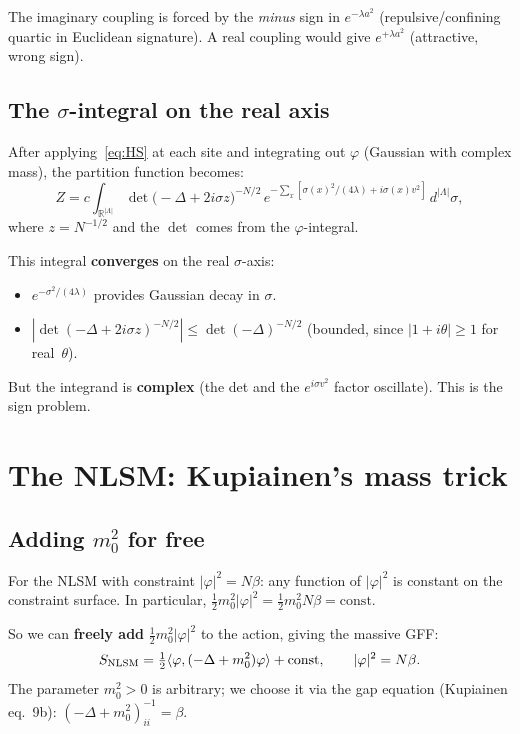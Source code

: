 \documentclass[12pt]{article}
\theoremstyle{definition}
\theoremstyle{remark}
\newcommand{\R}{\mathbb{R}}
\newcommand{\ph}{\varphi}
\newcommand{\La}{\Lambda}
\begin{document}
The imaginary coupling is forced by the \emph{minus} sign in
$e^{-\lambda a^2}$ (repulsive/confining quartic in Euclidean
signature). A real coupling would give $e^{+\lambda a^2}$
(attractive, wrong sign).

\subsection{The $\sigma$-integral on the real axis}

After applying~\eqref{eq:HS} at each site and integrating out $\ph$
(Gaussian with complex mass), the partition function becomes:
\begin{equation}
\label{eq:Zsigma}
  Z = c\!\int_{\R^{|\La|}}\!
    \det\bigl(-\Delta + 2i\sigma z\bigr)^{-N/2}\,
    e^{-\sum_x[\sigma(x)^2/(4\lambda)+i\sigma(x)v^2]}\,
    d^{|\La|}\sigma,
\end{equation}
where $z = N^{-1/2}$ and the $\det$ comes from the $\ph$-integral.

This integral \textbf{converges} on the real $\sigma$-axis:
\begin{itemize}
\item $e^{-\sigma^2/(4\lambda)}$ provides Gaussian decay in $\sigma$.
\item $|\det(-\Delta+2i\sigma z)^{-N/2}|
  \le \det(-\Delta)^{-N/2}$ (bounded, since $|1+i\theta| \ge 1$
  for real~$\theta$).
\end{itemize}
But the integrand is \textbf{complex} (the det and the $e^{i\sigma v^2}$
factor oscillate). This is the sign problem.

\section{The NLSM: Kupiainen's mass trick}

\subsection{Adding $m_0^2$ for free}

For the NLSM with constraint $|\ph|^2 = N\beta$: any function of
$|\ph|^2$ is constant on the constraint surface. In particular,
$\tfrac{1}{2}m_0^2|\ph|^2 = \tfrac{1}{2}m_0^2 N\beta = \text{const}$.

So we can \textbf{freely add} $\tfrac{1}{2}m_0^2|\ph|^2$ to the
action, giving the massive GFF:
\begin{equation}
  S_{\rm NLSM} = \tfrac{1}{2}\langle\ph,(-\Delta+m_0^2)\ph\rangle
    + \text{const},
  \qquad |\ph|^2 = N\beta.
\end{equation}
The parameter $m_0^2 > 0$ is arbitrary; we choose it via the gap
equation (Kupiainen eq.~9b):
$(-\Delta+m_0^2)^{-1}_{ii} = \beta$.
\end{document}
